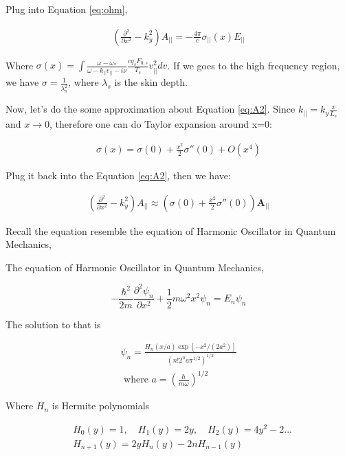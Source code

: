 Plug into Equation \ref{eq:ohm}, 

\begin{eqnarray}
(\frac{\partial^2 }{\partial x^2}-k_y^2)A_{||}=-\frac{4\pi}{c}\sigma_{||}(x)E_{||}
\end{eqnarray}

Where $\sigma(x)=\int\frac{\omega-\omega_*}{\omega - k_{||}v_{||}-i\nu}\frac{cq_sF_{0,s}}{T_s}v_{||}^2dv$. If we goes to the high frequency region, we have $\sigma=\frac{1}{\lambda_s^2}$, where $\lambda_s$ is the skin depth. 

Now, let's do the some approximation about Equation \ref{eq:A2}. Since $k_{||}=k_y\frac{x}{L_s}$ and $x\rightarrow 0$, therefore one can do Taylor expansion around x=0:

\begin{eqnarray}
     \sigma(x)= \sigma(0) +\frac{x^2}{2}\sigma''(0)+ O(x^4)
\end{eqnarray}

Plug it back into the Equation \ref{eq:A2}, then we have:

\begin{eqnarray}
     (\frac{\partial^2 }{\partial x^2}-k_y^2)A_{||}\approx (\sigma(0) +\frac{x^2}{2}\sigma''(0)) \textbf{A}_{||}
     \label{eq:MTM_eigen}
\end{eqnarray}

Recall the equation resemble the equation of Harmonic Oscillator in Quantum Mechanics, \cite{QM}\cite{formula}

The equation of Harmonic Oscillator in Quantum Mechanics,

\begin{equation}
-\frac{\hbar^{2}}{2 m} \frac{\partial^{2} \psi_{n}}{\partial x^{2}}+\frac{1}{2} m \omega^{2} x^{2} \psi_{n}=E_{n} \psi_{n}
\end{equation}

The solution to that is 

\begin{equation}
\begin{array}{l}{\psi_{n}=\frac{H_{n}(x / a) \exp \left[-x^{2} /\left(2 a^{2}\right)\right]}{\left(n ! 2^{n} a \pi^{1 / 2}\right)^{1 / 2}}} \\ {\text { where } a=\left(\frac{\hbar}{m \omega}\right)^{1 / 2}}\end{array}
\end{equation}

Where $H_n$ is Hermite polynomials

\begin{equation}
\begin{array}{ll} & {H_{0}(y)=1, \quad H_{1}(y)=2 y, \quad H_{2}(y)=4 y^{2}-2...} \\  & {H_{n+1}(y)=2 y H_{n}(y)-2 n H_{n-1}(y)}\end{array}
\end{equation}

